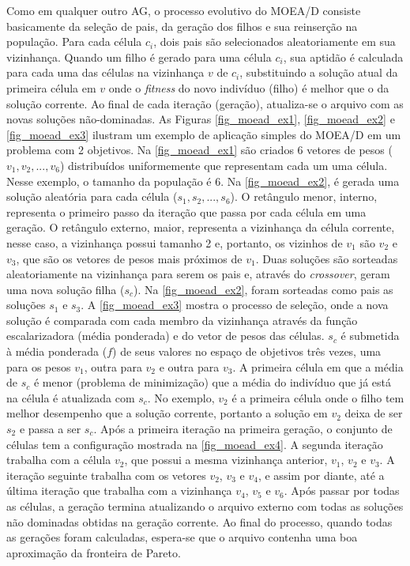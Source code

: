 Como em qualquer outro AG, o processo evolutivo do MOEA/D consiste basicamente da seleção de pais, da geração dos filhos e sua reinserção na população. Para cada célula $c_i$, dois pais são selecionados aleatoriamente em sua vizinhança. Quando um filho é gerado para uma célula $c_i$, sua aptidão é calculada para cada uma das células na vizinhança $v$ de $c_i$, substituindo a solução atual da primeira célula em $v$ onde o \textit{fitness} do novo indivíduo (filho) é melhor que o da solução corrente. Ao final de cada iteração (geração), atualiza-se o arquivo com as novas soluções não-dominadas. As Figuras \ref{fig_moead_ex1}, \ref{fig_moead_ex2} e \ref{fig_moead_ex3} ilustram um exemplo de aplicação simples do MOEA/D em um problema com 2 objetivos. Na \autoref{fig_moead_ex1} são criados 6 vetores de pesos ($v_1, v_2, ..., v_6$) distribuídos uniformemente que representam cada um uma célula. Nesse exemplo, o tamanho da população é 6. Na \autoref{fig_moead_ex2}, é gerada uma solução aleatória para cada célula ($s_1, s_2, ..., s_6$). O retângulo menor, interno, representa o primeiro passo da iteração que passa por cada célula em uma geração. O retângulo externo, maior, representa a vizinhança da célula corrente, nesse caso, a vizinhança possui tamanho 2 e, portanto, os vizinhos de $v_1$ são $v_2$ e $v_3$, que são os vetores de pesos mais próximos de $v_1$. Duas soluções são sorteadas aleatoriamente na vizinhança para serem os pais e, através do \textit{crossover}, geram uma nova solução filha ($s_c$). Na \autoref{fig_moead_ex2}, foram sorteadas como pais as soluções $s_1$ e $s_3$. A \autoref{fig_moead_ex3} mostra o processo de seleção, onde a nova solução é comparada com cada membro da vizinhança através da função escalarizadora (média ponderada) e do vetor de pesos das células. $s_c$ é submetida à média ponderada ($f$) de seus valores no espaço de objetivos três vezes, uma para os pesos $v_1$, outra para $v_2$ e outra para $v_3$. A primeira célula em que a média de $s_c$ é menor (problema de minimização) que a média do indivíduo que já está na célula é atualizada com $s_c$. No exemplo, $v_2$ é a primeira célula onde o filho tem melhor desempenho que a solução corrente, portanto a solução em $v_2$ deixa de ser $s_2$ e passa a ser $s_c$. Após a primeira iteração na primeira geração, o conjunto de células tem a configuração mostrada na  \autoref{fig_moead_ex4}. A segunda iteração trabalha com a célula $v_2$, que possui a mesma vizinhança anterior, $v_1$, $v_2$ e $v_3$. A iteração seguinte trabalha com os vetores $v_2$, $v_3$ e $v_4$, e assim por diante, até a última iteração que trabalha com a vizinhança $v_4$, $v_5$ e $v_6$. Após passar por todas as células, a geração termina atualizando o arquivo externo com todas as soluções não dominadas obtidas na geração corrente. Ao final do processo, quando todas as gerações foram calculadas, espera-se que o arquivo contenha uma boa aproximação da fronteira de Pareto.

